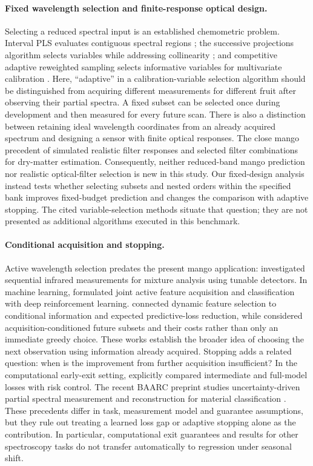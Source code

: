 \documentclass[11pt,a4paper]{article}
\begin{document}
\paragraph{Fixed wavelength selection and finite-response optical design.}
Selecting a reduced spectral input is an established chemometric problem. Interval PLS evaluates contiguous spectral regions \citep{norgaard2000ipls}; the successive projections algorithm selects variables while addressing collinearity \citep{araujo2001spa}; and competitive adaptive reweighted sampling selects informative variables for multivariate calibration \citep{li2009cars}. Here, ``adaptive'' in a calibration-variable selection algorithm should be distinguished from acquiring different measurements for different fruit after observing their partial spectra. A fixed subset can be selected once during development and then measured for every future scan. There is also a distinction between retaining ideal wavelength coordinates from an already acquired spectrum and designing a sensor with finite optical responses. The close mango precedent of \citet{gutierrez2019} simulated realistic filter responses and selected filter combinations for dry-matter estimation. Consequently, neither reduced-band mango prediction nor realistic optical-filter selection is new in this study. Our fixed-design analysis instead tests whether selecting subsets and nested orders within the specified bank improves fixed-budget prediction and changes the comparison with adaptive stopping. The cited variable-selection methods situate that question; they are not presented as additional algorithms executed in this benchmark.

\paragraph{Conditional acquisition and stopping.}
Active wavelength selection predates the present mango application: \citet{huang2015} investigated sequential infrared measurements for mixture analysis using tunable detectors. In machine learning, \citet{shim2018} formulated joint active feature acquisition and classification with deep reinforcement learning. \citet{covert2023} connected dynamic feature selection to conditional information and expected predictive-loss reduction, while \citet{valancius2024} considered acquisition-conditioned future subsets and their costs rather than only an immediate greedy choice. These works establish the broader idea of choosing the next observation using information already acquired. Stopping adds a related question: when is the improvement from further acquisition insufficient? In the computational early-exit setting, \citet{jazbec2024} explicitly compared intermediate and full-model losses with risk control. The recent BAARC preprint studies uncertainty-driven partial spectral measurement and reconstruction for material classification \citep{baarc2026}. These precedents differ in task, measurement model and guarantee assumptions, but they rule out treating a learned loss gap or adaptive stopping alone as the contribution. In particular, computational exit guarantees and results for other spectroscopy tasks do not transfer automatically to regression under seasonal shift.
\end{document}
